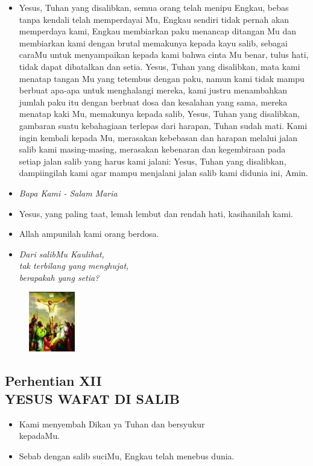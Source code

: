 \documentclass[a5paper,headsepline,titlepage,10pt,nnormalheadings,DIVcalc]{scrbook}
\newcommand{\BU}[1]{\begin{itemize} \item[U:] #1 \end{itemize}}
\newcommand{\BP}[1]{\begin{itemize} \item[P:] #1 \end{itemize}}
\newcommand{\kamiMenyembah}{\BP{ Kami menyembah Dikau ya Tuhan dan bersyukur\\kepadaMu.}
\BU{ Sebab dengan salib suciMu, Engkau telah menebus dunia.}
}
\newcommand{\kasihanilahKami}{\BP{Yesus, yang paling taat, lemah lembut dan rendah hati, kasihanilah kami.}
\BU{Allah ampunilah kami orang berdosa.}}
\begin{document}
\BU{Yesus, Tuhan yang disalibkan, semua orang telah menipu Engkau, bebas tanpa kendali telah memperdayai Mu, Engkau sendiri tidak pernah akan memperdaya kami, Engkau membiarkan paku menancap ditangan Mu dan membiarkan kami dengan brutal memakunya kepada kayu salib, sebagai caraMu untuk menyampaikan kepada kami bahwa cinta Mu benar, tulus hati, tidak dapat dibatalkan dan setia. Yesus, Tuhan yang disalibkan, mata kami menatap tangan Mu yang tetembus dengan paku, namun kami tidak mampu berbuat apa-apa untuk menghalangi mereka, kami justru menambahkan jumlah paku itu dengan berbuat dosa dan kesalahan yang sama, mereka menatap kaki Mu, memakunya kepada salib, Yesus, Tuhan yang disalibkan, gambaran suatu kebahagiaan terlepas dari harapan, Tuhan sudah mati. Kami ingin kembali kepada Mu, merasakan kebebasan dan harapan melalui jalan salib kami masing-masing, merasakan kebenaran dan kegembiraan pada setiap jalan salib yang harus kami jalani: Yesus, Tuhan yang disalibkan, dampiingilah kami agar mampu menjalani jalan salib kami didunia ini, Amin.}

\large\begin{itemize}\item[~]\it{Bapa Kami - Salam Maria}\end{itemize}\normalsize
\kasihanilahKami

\begin{itemize}
\item[12.] \it{Dari salibMu Kaulihat,\\
	tak terbilang yang menghujat,\\
	berapakah yang setia?}
\end{itemize}


\begin{figure}
\includegraphics[width=2cm]{jalansalib_files/12_small.jpg}
\end{figure}
\subsection*{Perhentian XII\\
YESUS WAFAT DI SALIB}

\kamiMenyembah
\end{document}
